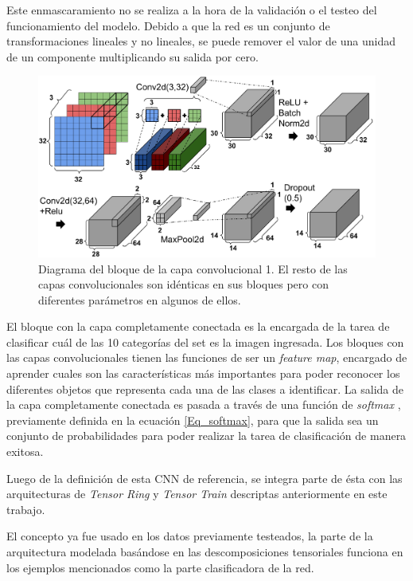 \documentclass[spanish]{article}
\theoremstyle{definition}
\theoremstyle{remark}
\numberwithin{equation}{section}
\numberwithin{equation}{section} %
\begin{document}
Este enmascaramiento no se realiza a la hora de la validación o el testeo del funcionamiento del modelo. Debido a que la red es un conjunto de transformaciones lineales y no lineales, se puede remover el valor de una unidad de un componente multiplicando su salida por cero.
\begin{figure}[H]
\centering
\includegraphics[width=15cm]{img/Cifar_CNN_Block.png}
\caption[Diagrama del bloque de la capa convolucional]{\footnotesize{ Diagrama del bloque de la capa convolucional 1. El resto de las capas convolucionales son idénticas en sus bloques pero con diferentes parámetros en algunos de ellos.    }}
\label{fig:convolutional_block}
\end{figure}
\par
El bloque con la capa completamente conectada es la encargada de la tarea de clasificar cuál de las 10 categorías del set es la imagen ingresada. Los bloques con las capas convolucionales tienen las funciones de ser un \textit{feature map}, encargado de aprender cuales son las características más importantes para poder reconocer los diferentes objetos que representa cada una de las clases a identificar. La salida de la capa completamente conectada es pasada a través de una función de \textit{softmax} \cite{bridle1990probabilistic}, previamente definida en la ecuación \eqref{Eq_softmax}, para que la salida sea un  conjunto de probabilidades para poder realizar la tarea de clasificación de manera exitosa. 
\par
Luego de la definición de esta CNN de referencia, se integra parte de ésta con 
las arquitecturas de \textit{Tensor Ring} y \textit{Tensor Train} descriptas anteriormente en este trabajo. 

El concepto ya fue usado en los datos previamente testeados, la parte de la arquitectura modelada basándose en las descomposiciones tensoriales funciona en los ejemplos mencionados como la parte clasificadora de la red.
\end{document}
